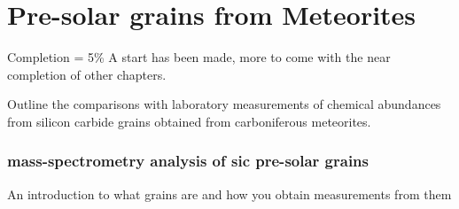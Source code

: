 \chapter{Pre-solar grains from Meteorites}

Completion = 5\%
A start has been made, more to come with the near completion of other chapters.

Outline the comparisons with laboratory measurements of chemical abundances from silicon carbide grains obtained from carboniferous meteorites.

\subsection{mass-spectrometry analysis of \acrfull{sic} pre-solar grains}

An introduction to what grains are and how you obtain measurements from them